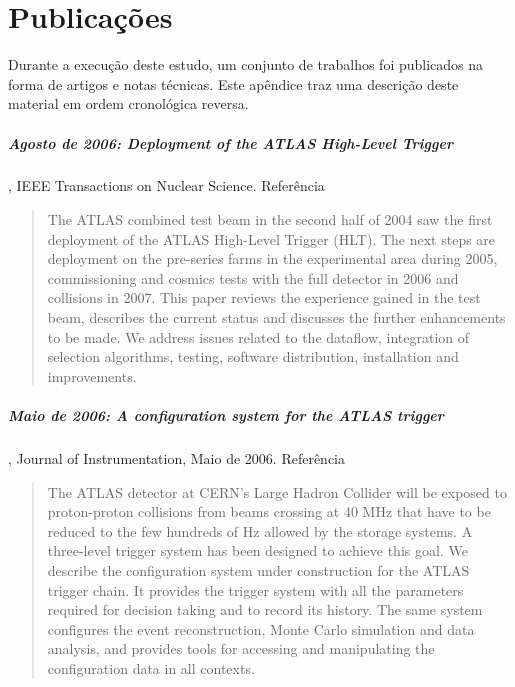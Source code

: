 \typeout{ ====================================================================}
\typeout{ ====================================================================}

\newcommand{\sectioneng}[1]{\foreignlanguage{english}{#1\/}}

\chapter{Publicações}
\label{chap:published}

Durante a execução deste estudo, um conjunto de trabalhos foi publicados na
forma de artigos e notas técnicas. Este apêndice traz uma descrição deste
material em ordem cronológica reversa.

\paragraph{Agosto de 2006: \sectioneng{Deployment of the ATLAS High-Level
Trigger}}, IEEE Transactions on Nuclear Science. Referência~\cite{aa:tns-06}

\begin{quotation}
The ATLAS combined test beam in the second half of 2004 saw the first
deployment of the ATLAS High-Level Trigger (HLT). The next steps are
deployment on the pre-series farms in the experimental area during 2005,
commissioning and cosmics tests with the full detector in 2006 and collisions
in 2007. This paper reviews the experience gained in the test beam, describes
the current status and discusses the further enhancements to be made. We
address issues related to the dataflow, integration of selection algorithms,
testing, software distribution, installation and improvements.
\end{quotation}

\paragraph{Maio de 2006: \sectioneng{A configuration system for the ATLAS
trigger}}, Journal of Instrumentation, Maio de
2006. Referência~\cite{aa:jinst-06}

\begin{quotation}
The ATLAS detector at CERN's Large Hadron Collider will be exposed to
proton-proton collisions from beams crossing at 40 MHz that have to be
reduced to the few hundreds of Hz allowed by the storage systems. A
three-level trigger system has been designed to achieve this goal. We describe
the configuration system under construction for the ATLAS trigger chain. It
provides the trigger system with all the parameters required for decision
taking and to record its history. The same system configures the event
reconstruction, Monte Carlo simulation and data analysis, and provides tools
for accessing and manipulating the configuration data in all contexts.
\end{quotation}

